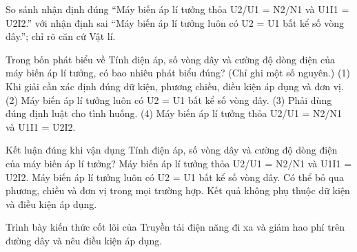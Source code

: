 \begin{bt}
So sánh nhận định đúng “Máy biến áp lí tưởng thỏa U2/U1 = N2/N1 và U1I1 = U2I2.” với nhận định sai “Máy biến áp lí tưởng luôn có U2 = U1 bất kể số vòng dây.”; chỉ rõ căn cứ Vật lí.
\end{bt}

\begin{ex}
Trong bốn phát biểu về Tính điện áp, số vòng dây và cường độ dòng điện của máy biến áp lí tưởng, có bao nhiêu phát biểu đúng? (Chỉ ghi một số nguyên.) (1) Khi giải cần xác định đúng dữ kiện, phương chiều, điều kiện áp dụng và đơn vị. (2) Máy biến áp lí tưởng luôn có U2 = U1 bất kể số vòng dây. (3) Phải dùng đúng định luật cho tình huống. (4) Máy biến áp lí tưởng thỏa U2/U1 = N2/N1 và U1I1 = U2I2.
\end{ex}

\begin{ex}
Kết luận đúng khi vận dụng Tính điện áp, số vòng dây và cường độ dòng điện của máy biến áp lí tưởng?
\choice
{\True Máy biến áp lí tưởng thỏa U2/U1 = N2/N1 và U1I1 = U2I2.}
{Máy biến áp lí tưởng luôn có U2 = U1 bất kể số vòng dây.}
{Có thể bỏ qua phương, chiều và đơn vị trong mọi trường hợp.}
{Kết quả không phụ thuộc dữ kiện và điều kiện áp dụng.}
\end{ex}

\begin{bt}
Trình bày kiến thức cốt lõi của Truyền tải điện năng đi xa và giảm hao phí trên đường dây và nêu điều kiện áp dụng.
\end{bt}

